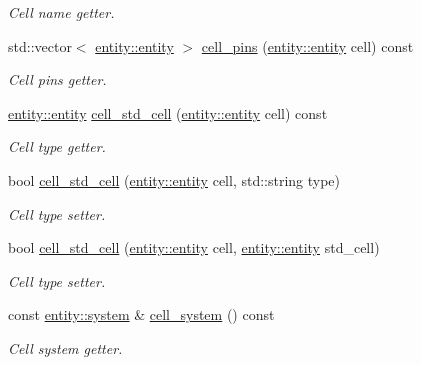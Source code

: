 \begin{DoxyCompactItemize}
\begin{DoxyCompactList}\small\item\em Cell name getter. \end{DoxyCompactList}\item 
std\-::vector$<$ \hyperlink{classophidian_1_1entity_1_1entity}{entity\-::entity} $>$ \hyperlink{classophidian_1_1netlist_1_1netlist_addef5a455c87dbcb26b55a3e624c964e}{cell\-\_\-pins} (\hyperlink{classophidian_1_1entity_1_1entity}{entity\-::entity} cell) const 
\begin{DoxyCompactList}\small\item\em Cell pins getter. \end{DoxyCompactList}\item 
\hyperlink{classophidian_1_1entity_1_1entity}{entity\-::entity} \hyperlink{classophidian_1_1netlist_1_1netlist_ae2da9561b53fae34c02ac37929e3bc0f}{cell\-\_\-std\-\_\-cell} (\hyperlink{classophidian_1_1entity_1_1entity}{entity\-::entity} cell) const 
\begin{DoxyCompactList}\small\item\em Cell type getter. \end{DoxyCompactList}\item 
bool \hyperlink{classophidian_1_1netlist_1_1netlist_aecf16e06c5b2410a57e3808eafdd9a90}{cell\-\_\-std\-\_\-cell} (\hyperlink{classophidian_1_1entity_1_1entity}{entity\-::entity} cell, std\-::string type)
\begin{DoxyCompactList}\small\item\em Cell type setter. \end{DoxyCompactList}\item 
bool \hyperlink{classophidian_1_1netlist_1_1netlist_ab79b0117e84d8dd70178fa29072b51c3}{cell\-\_\-std\-\_\-cell} (\hyperlink{classophidian_1_1entity_1_1entity}{entity\-::entity} cell, \hyperlink{classophidian_1_1entity_1_1entity}{entity\-::entity} std\-\_\-cell)
\begin{DoxyCompactList}\small\item\em Cell type setter. \end{DoxyCompactList}\item 
const \hyperlink{classophidian_1_1entity_1_1system}{entity\-::system} \& \hyperlink{classophidian_1_1netlist_1_1netlist_adc43e9a4f5c5a4c25188a0c8a107422f}{cell\-\_\-system} () const 
\begin{DoxyCompactList}\small\item\em Cell system getter. \end{DoxyCompactList}\item 

\end{DoxyCompactItemize}

